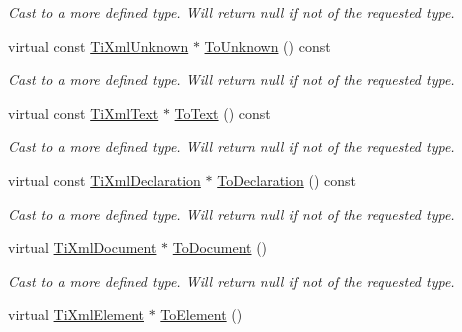 \begin{DoxyCompactItemize}
\begin{DoxyCompactList}\small\item\em \-Cast to a more defined type. \-Will return null if not of the requested type. \end{DoxyCompactList}\item 
\hypertarget{classTiXmlNode_afd7205cf31d7a376929f8a36930627a2}{
virtual const \hyperlink{classTiXmlUnknown}{\-Ti\-Xml\-Unknown} $\ast$ \hyperlink{classTiXmlNode_afd7205cf31d7a376929f8a36930627a2}{\-To\-Unknown} () const }
\label{d3/dd5/classTiXmlNode_afd7205cf31d7a376929f8a36930627a2}

\begin{DoxyCompactList}\small\item\em \-Cast to a more defined type. \-Will return null if not of the requested type. \end{DoxyCompactList}\item 
\hypertarget{classTiXmlNode_a95a46a52c525992d6b4ee08beb14cd69}{
virtual const \hyperlink{classTiXmlText}{\-Ti\-Xml\-Text} $\ast$ \hyperlink{classTiXmlNode_a95a46a52c525992d6b4ee08beb14cd69}{\-To\-Text} () const }
\label{d3/dd5/classTiXmlNode_a95a46a52c525992d6b4ee08beb14cd69}

\begin{DoxyCompactList}\small\item\em \-Cast to a more defined type. \-Will return null if not of the requested type. \end{DoxyCompactList}\item 
\hypertarget{classTiXmlNode_a9f43e6984fc7d4afd6eb32714c6b7b72}{
virtual const \hyperlink{classTiXmlDeclaration}{\-Ti\-Xml\-Declaration} $\ast$ \hyperlink{classTiXmlNode_a9f43e6984fc7d4afd6eb32714c6b7b72}{\-To\-Declaration} () const }
\label{d3/dd5/classTiXmlNode_a9f43e6984fc7d4afd6eb32714c6b7b72}

\begin{DoxyCompactList}\small\item\em \-Cast to a more defined type. \-Will return null if not of the requested type. \end{DoxyCompactList}\item 
\hypertarget{classTiXmlNode_a6a4c8ac28ee7a745d059db6691e03bae}{
virtual \hyperlink{classTiXmlDocument}{\-Ti\-Xml\-Document} $\ast$ \hyperlink{classTiXmlNode_a6a4c8ac28ee7a745d059db6691e03bae}{\-To\-Document} ()}
\label{d3/dd5/classTiXmlNode_a6a4c8ac28ee7a745d059db6691e03bae}

\begin{DoxyCompactList}\small\item\em \-Cast to a more defined type. \-Will return null if not of the requested type. \end{DoxyCompactList}\item 
\hypertarget{classTiXmlNode_aa65d000223187d22a4dcebd7479e9ebc}{
virtual \hyperlink{classTiXmlElement}{\-Ti\-Xml\-Element} $\ast$ \hyperlink{classTiXmlNode_aa65d000223187d22a4dcebd7479e9ebc}{\-To\-Element} ()}
\label{d3/dd5/classTiXmlNode_aa65d000223187d22a4dcebd7479e9ebc}


\end{DoxyCompactItemize}
